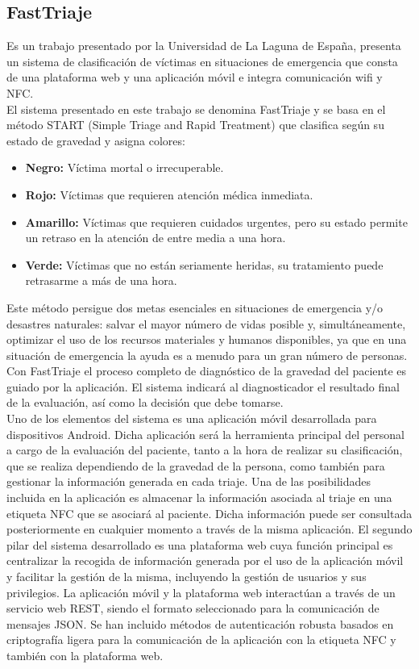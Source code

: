\documentclass[11pt,openany]{book}
\newcounter{ns}
\begin{document}
	\subsection{FastTriaje \cite{HernandezGoya2014}}
	Es un trabajo presentado por la Universidad de La Laguna de España, presenta un sistema de clasificación de víctimas en situaciones de emergencia que consta de una plataforma web y una aplicación móvil e integra comunicación wifi y NFC.\\
	El sistema presentado en este trabajo se denomina FastTriaje
	y se basa en el método START (Simple Triage and Rapid
	Treatment) que clasifica según su estado de gravedad y asigna colores:

	\begin{itemize}
		\item \textbf{Negro: }Víctima mortal o irrecuperable.
		\item \textbf{Rojo: }Víctimas que requieren atención médica inmediata.
		\item \textbf{Amarillo: }Víctimas que requieren cuidados urgentes, pero su estado permite un retraso en la atención de entre media a una hora.
		\item \textbf{Verde: }Víctimas que no están seriamente heridas, su tratamiento puede retrasarme a más de una hora.
	\end{itemize}

	Este método persigue dos metas esenciales en
	situaciones de emergencia y/o desastres naturales: salvar el
	mayor número de vidas posible y, simultáneamente, optimizar
	el uso de los recursos materiales y humanos disponibles, ya que en una situación de emergencia la ayuda es a menudo para un gran número de personas. Con FastTriaje el proceso completo de diagnóstico de
	la gravedad del paciente es guiado por la aplicación. El sistema
	indicará al diagnosticador el resultado final de la evaluación,
	así como la decisión que debe tomarse.\\
	Uno de los elementos del sistema es una aplicación
	móvil desarrollada para dispositivos Android. Dicha aplicación
	será la herramienta principal del personal a cargo de la evaluación del paciente, tanto a la hora de realizar su clasificación, que se realiza dependiendo de la gravedad de la persona, como también para gestionar la información generada en cada
	triaje. Una de las posibilidades incluida en la aplicación es almacenar la información asociada al triaje en una etiqueta
	NFC que se asociará al paciente. Dicha información puede
	ser consultada posteriormente en cualquier momento a través
	de la misma aplicación.
	El segundo pilar del sistema desarrollado es una plataforma
	web cuya función principal es centralizar la recogida de
	información generada por el uso de la aplicación móvil y
	facilitar la gestión de la misma, incluyendo la gestión de
	usuarios y sus privilegios.
	La aplicación móvil y la plataforma web interactúan a través
	de un servicio web REST, siendo el formato seleccionado para
	la comunicación de mensajes JSON.
	Se han incluido métodos de autenticación robusta basados
	en criptografía ligera para la comunicación de la aplicación
	con la etiqueta NFC y también con la plataforma web.
\end{document}
